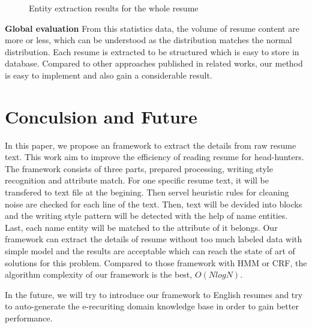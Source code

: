 \documentclass{acm_proc_article-sp}
\begin{document}
\begin{figure}\label{total-scores}
\centering
{}
\caption{Entity extraction results for the whole resume}
\end{figure}

\textbf{Global evaluation}
From this statistics data, the volume of resume content are more or less, which can be understood as the distribution matches the normal distribution.
Each resume is extracted to be structured which is easy to store in database.
Compared to other approaches published in related works, our method is easy to implement and also gain a considerable result.


\section{Conculsion and Future}\label{conculsion-future}

In this paper, we propose an framework to extract the details from raw resume text. 
This work aim to improve the efficiency of reading resume for head-hunters.
The framework consists of three parts, prepared processing, writing style recognition and attribute match.
For one specific resume text, it will be transfered to text file at the begining. 
Then servel heuristic rules for cleaning noise are checked for each line of the text.
Then, text will be devided into blocks and the writing style pattern will be detected with the help of name entities.
Last, each name entity will be matched to the attribute of it belongs.
Our framework can extract the details of resume without too much labeled data with simple model and the results are acceptable which can reach the state of art of solutions for this problem.
Compared to those framework with HMM or CRF, the algorithm complexity of our framework is the best, $O(NlogN)$.

In the future, we will try to introduce our framework to English resumes and try to auto-generate the e-recuriting domain knowledge base in order to gain better performance.




 
\end{document}
